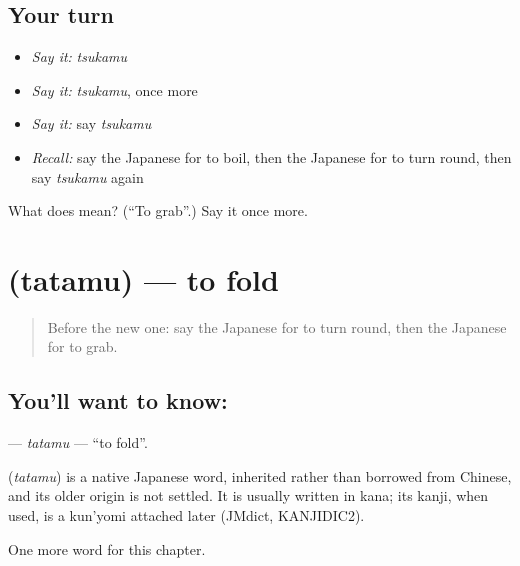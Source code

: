 \subsection*{Your turn}
\begin{itemize}
\raggedright
  \item \emph{Say it:} \emph{tsukamu}
  \item \emph{Say it:} \emph{tsukamu}, once more
  \item \emph{Say it:} say \emph{tsukamu}
  \item \emph{Recall:} say the Japanese for to boil, then the Japanese for to turn round, then say \emph{tsukamu} again
\end{itemize}

\begin{tcolorbox}[breakable,colback=teal!4,colframe=teal!35!black,title={Before you move on}]
What does  mean? (\textquotedblleft{}To grab\textquotedblright{}.) Say it once more.
\end{tcolorbox}
\section[\texorpdfstring{\ja{たたむ} (tatamu)}{たたむ (tatamu)}]{ (tatamu) — to fold}

\label{lesson:JA-C89-tatamu}



\begin{quote}
Before the new one: say the Japanese for to turn round, then the Japanese for to grab.
\end{quote}

\subsection*{You'll want to know: }
\textbf{} — \emph{tatamu} — \textquotedblleft{}to fold\textquotedblright{}.

\begin{cousinweb}
\textbf{} (\emph{tatamu}) is a native Japanese word, inherited rather than borrowed from Chinese, and its older origin is not settled. It is usually written in kana; its kanji, when used, is a kun'yomi attached later (JMdict, KANJIDIC2).
\end{cousinweb}

\begin{grammarlens}[title={What you've built}]
One more word for this chapter.
\end{grammarlens}

